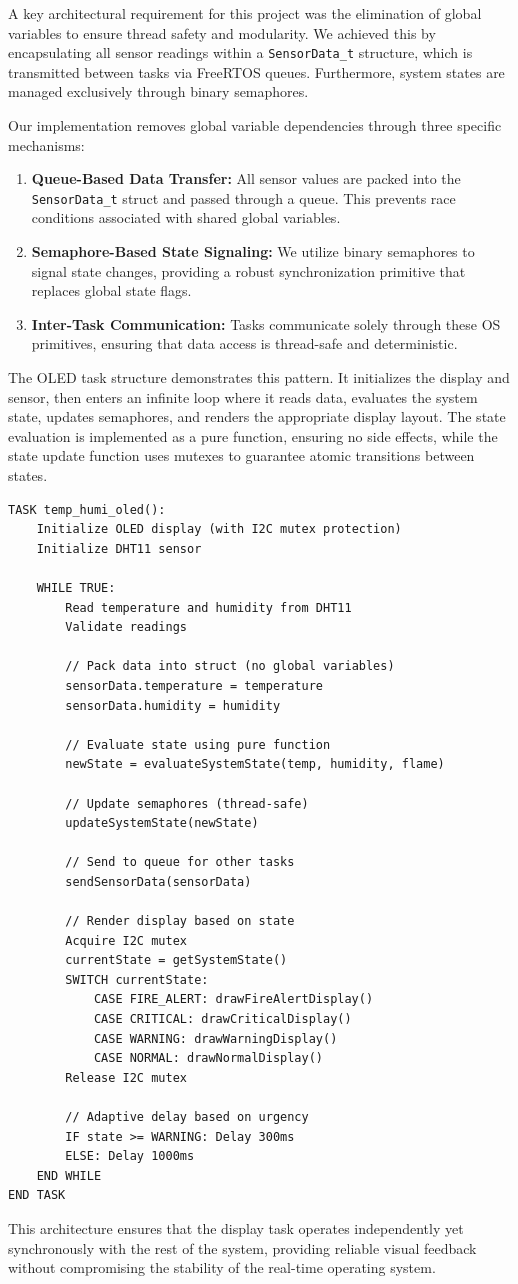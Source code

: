 A key architectural requirement for this project was the elimination of global variables to ensure thread safety and modularity. We achieved this by encapsulating all sensor readings within a \texttt{SensorData\_t} structure, which is transmitted between tasks via FreeRTOS queues. Furthermore, system states are managed exclusively through binary semaphores.

Our implementation removes global variable dependencies through three specific mechanisms:

\begin{enumerate}
    \item \textbf{Queue-Based Data Transfer:} All sensor values are packed into the \texttt{SensorData\_t} struct and passed through a queue. This prevents race conditions associated with shared global variables.
    \item \textbf{Semaphore-Based State Signaling:} We utilize binary semaphores to signal state changes, providing a robust synchronization primitive that replaces global state flags.
    \item \textbf{Inter-Task Communication:} Tasks communicate solely through these OS primitives, ensuring that data access is thread-safe and deterministic.
\end{enumerate}

The OLED task structure demonstrates this pattern. It initializes the display and sensor, then enters an infinite loop where it reads data, evaluates the system state, updates semaphores, and renders the appropriate display layout. The state evaluation is implemented as a pure function, ensuring no side effects, while the state update function uses mutexes to guarantee atomic transitions between states.

\begin{verbatim}
TASK temp_humi_oled():
    Initialize OLED display (with I2C mutex protection)
    Initialize DHT11 sensor
    
    WHILE TRUE:
        Read temperature and humidity from DHT11
        Validate readings
        
        // Pack data into struct (no global variables)
        sensorData.temperature = temperature
        sensorData.humidity = humidity
        
        // Evaluate state using pure function
        newState = evaluateSystemState(temp, humidity, flame)
        
        // Update semaphores (thread-safe)
        updateSystemState(newState)
        
        // Send to queue for other tasks
        sendSensorData(sensorData)
        
        // Render display based on state
        Acquire I2C mutex
        currentState = getSystemState()
        SWITCH currentState:
            CASE FIRE_ALERT: drawFireAlertDisplay()
            CASE CRITICAL: drawCriticalDisplay()
            CASE WARNING: drawWarningDisplay()
            CASE NORMAL: drawNormalDisplay()
        Release I2C mutex
        
        // Adaptive delay based on urgency
        IF state >= WARNING: Delay 300ms
        ELSE: Delay 1000ms
    END WHILE
END TASK
\end{verbatim}

This architecture ensures that the display task operates independently yet synchronously with the rest of the system, providing reliable visual feedback without compromising the stability of the real-time operating system.
